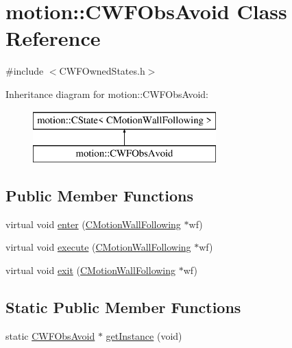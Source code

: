 \hypertarget{classmotion_1_1CWFObsAvoid}{}\section{motion\+:\+:C\+W\+F\+Obs\+Avoid Class Reference}
\label{classmotion_1_1CWFObsAvoid}


{\ttfamily \#include $<$C\+W\+F\+Owned\+States.\+h$>$}

Inheritance diagram for motion\+:\+:C\+W\+F\+Obs\+Avoid\+:\begin{figure}[H]
\begin{center}
\leavevmode
\includegraphics[height=2.000000cm]{classmotion_1_1CWFObsAvoid}
\end{center}
\end{figure}
\subsection*{Public Member Functions}
\begin{DoxyCompactItemize}
\item 
virtual void \mbox{\hyperlink{classmotion_1_1CWFObsAvoid_aee2e80e821ecd29528f048c99813b63a}{enter}} (\mbox{\hyperlink{classmotion_1_1CMotionWallFollowing}{C\+Motion\+Wall\+Following}} $\ast$wf)
\item 
virtual void \mbox{\hyperlink{classmotion_1_1CWFObsAvoid_a458771fccc326a8b02e4f947cdbb7f3b}{execute}} (\mbox{\hyperlink{classmotion_1_1CMotionWallFollowing}{C\+Motion\+Wall\+Following}} $\ast$wf)
\item 
virtual void \mbox{\hyperlink{classmotion_1_1CWFObsAvoid_af95e36cbc64c2c47fdf5d6ad5dde90a8}{exit}} (\mbox{\hyperlink{classmotion_1_1CMotionWallFollowing}{C\+Motion\+Wall\+Following}} $\ast$wf)
\end{DoxyCompactItemize}
\subsection*{Static Public Member Functions}
\begin{DoxyCompactItemize}
\item 
static \mbox{\hyperlink{classmotion_1_1CWFObsAvoid}{C\+W\+F\+Obs\+Avoid}} $\ast$ \mbox{\hyperlink{classmotion_1_1CWFObsAvoid_a67a97a1719b8d637a9cf154bd8977171}{get\+Instance}} (void)
\end{DoxyCompactItemize}



